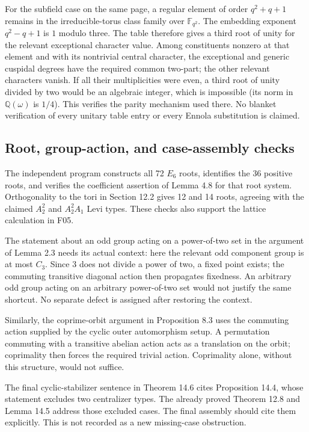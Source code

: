 \documentclass[10pt]{article}
\begin{document}
For the subfield case on the same page, a regular element of order \(q^2+q+1\) remains in the irreducible-torus class family over \(\mathbb F_{q^2}\). The embedding exponent \(q^2-q+1\) is \(1\) modulo three. The table therefore gives a third root of unity for the relevant exceptional character value. Among constituents nonzero at that element and with its nontrivial central character, the exceptional and generic cuspidal degrees have the required common two-part; the other relevant characters vanish. If all their multiplicities were even, a third root of unity divided by two would be an algebraic integer, which is impossible (its norm in \(\mathbb Q(\omega)\) is \(1/4\)). This verifies the parity mechanism used there. No blanket verification of every unitary table entry or every Ennola substitution is claimed.\par
\subsection*{Root, group-action, and case-assembly checks}
The independent program constructs all 72 \(E_6\) roots, identifies the 36 positive roots, and verifies the coefficient assertion of Lemma 4.8 for that root system. Orthogonality to the tori in Section 12.2 gives 12 and 14 roots, agreeing with the claimed \(A_2^2\) and \(A_2^2A_1\) Levi types. These checks also support the lattice calculation in F05.\par
The statement about an odd group acting on a power-of-two set in the argument of Lemma 2.3 needs its actual context: here the relevant odd component group is at most \(C_3\). Since \(3\) does not divide a power of two, a fixed point exists; the commuting transitive diagonal action then propagates fixedness. An arbitrary odd group acting on an arbitrary power-of-two set would not justify the same shortcut. No separate defect is assigned after restoring the context.\par
Similarly, the coprime-orbit argument in Proposition 8.3 uses the commuting action supplied by the cyclic outer automorphism setup. A permutation commuting with a transitive abelian action acts as a translation on the orbit; coprimality then forces the required trivial action. Coprimality alone, without this structure, would not suffice.\par
The final cyclic-stabilizer sentence in Theorem 14.6 cites Proposition 14.4, whose statement excludes two centralizer types. The already proved Theorem 12.8 and Lemma 14.5 address those excluded cases. The final assembly should cite them explicitly. This is not recorded as a new missing-case obstruction.\par
\end{document}
